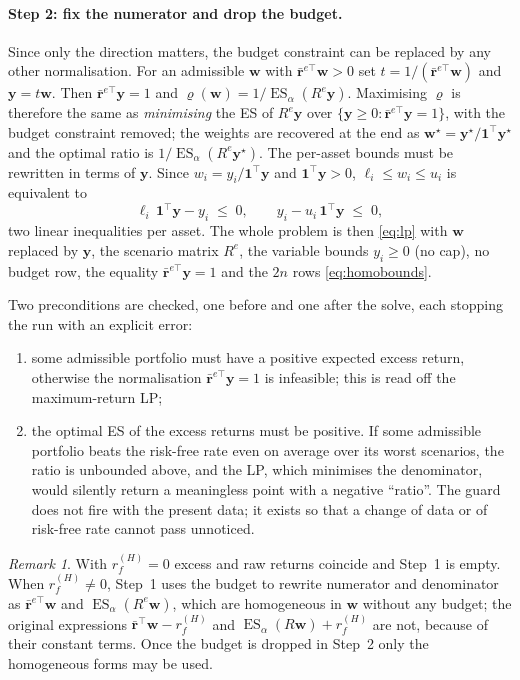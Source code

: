 \documentclass[11pt,a4paper]{article}
\newcommand{\ES}{\operatorname{ES}}
\newcommand{\w}{\mathbf{w}}
\newcommand{\y}{\mathbf{y}}
\newcommand{\rr}{\mathbf{r}}
\newcommand{\ones}{\mathbf{1}}
\theoremstyle{plain}
\theoremstyle{remark}
\newtheorem{remark}{Remark}
\begin{document}
\paragraph{Step 2: fix the numerator and drop the budget.} Since only the
direction matters, the budget constraint can be replaced by any other
normalisation. For an admissible $\w$ with $\bar{\rr}^{e\top}\w > 0$ set
$t = 1/(\bar{\rr}^{e\top}\w)$ and $\y = t\w$. Then $\bar{\rr}^{e\top}\y = 1$
and $\varrho(\w) = 1/\ES_\alpha(R^{e}\y)$. Maximising $\varrho$ is therefore
the same as \emph{minimising} the ES of $R^{e}\y$ over
$\{\y \ge 0 : \bar{\rr}^{e\top}\y = 1\}$, with the budget constraint
removed; the weights are recovered at the end as
$\w^\star = \y^\star/\ones^\top\y^\star$ and the optimal ratio is
$1/\ES_\alpha(R^{e}\y^\star)$. The per-asset bounds must be rewritten in
terms of $\y$. Since $w_i = y_i/\ones^\top\y$ and $\ones^\top\y > 0$,
$\ell_i \le w_i \le u_i$ is equivalent to
\begin{equation}
  \ell_i\,\ones^\top\y - y_i \;\le\; 0, \qquad y_i - u_i\,\ones^\top\y \;\le\; 0,
  \label{eq:homobounds}
\end{equation}
two linear inequalities per asset. The whole problem is then \eqref{eq:lp}
with $\w$ replaced by $\y$, the scenario matrix $R^{e}$, the variable bounds
$y_i \ge 0$ (no cap), no budget row, the equality $\bar{\rr}^{e\top}\y = 1$
and the $2n$ rows \eqref{eq:homobounds}.

Two preconditions are checked, one before and one after the solve, each
stopping the run with an explicit error:
\begin{enumerate}[nosep]
  \item some admissible portfolio must have a positive expected excess
        return, otherwise the normalisation $\bar{\rr}^{e\top}\y = 1$ is
        infeasible; this is read off the maximum-return LP;
  \item the optimal ES of the excess returns must be positive. If some
        admissible portfolio beats the risk-free rate even on average over
        its worst scenarios, the ratio is unbounded above, and the LP, which
        minimises the denominator, would silently return a meaningless point
        with a negative ``ratio''. The guard does not fire with
        the present data; it exists so that a change of data or of risk-free
        rate cannot pass unnoticed.
\end{enumerate}

\begin{remark}
With $r_f^{(H)} = 0$ excess and raw returns coincide and Step~1 is empty.
When $r_f^{(H)} \ne 0$, Step~1 uses the budget to rewrite numerator and
denominator as $\bar{\rr}^{e\top}\w$ and $\ES_\alpha(R^{e}\w)$, which are
homogeneous in $\w$ without any budget; the original expressions
$\bar{\rr}^\top\w - r_f^{(H)}$ and $\ES_\alpha(R\w) + r_f^{(H)}$ are not,
because of their constant terms. Once the budget is dropped in Step~2 only
the homogeneous forms may be used.
\end{remark}
\end{document}
